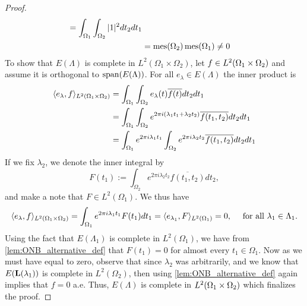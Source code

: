 \documentclass[../thesis.tex]{subfiles}
\begin{document}
\begin{proof}
\begin{align*}
        = \int_{\Omega_1} \int_{\Omega_2} |1|^2 dt_2 dt_1\\
        &= \operatorname{mes}(\Omega_2)\operatorname{mes}(\Omega_1) \neq 0
    \end{align*}
    To show that $E(\Lambda)$ is complete in $L^2(\Omega_1 \times \Omega_2)$, let $f\in L^2(\Omega_1 \times \Omega_2)$ and assume it is orthogonal to $\operatorname{span}(E(\Lambda))$. For all $e_\lambda \in E(\Lambda)$ the inner product is
    \begin{align*} %
        \braa{e_\lambda,f}_{L^2\brac{\Omega_1 \times \Omega_2}}
        &= \int_{\Omega_1} \int_{\Omega_2} e_\lambda(t) \overline{f(t)} dt_2dt_1 \\
        &= \int_{\Omega_1} \int_{\Omega_2} e^{2\pi i  (\lambda_1 t_1 + \lambda_2 t_2)} \overline{f(t_1,t_2)} dt_2 dt_1 \\
        &= \int_{\Omega_1} e^{2 \pi i \lambda_1 t_1} \int_{\Omega_2}e^{2 \pi i \lambda_2 t_2} \overline{f(t_1,t_2)} dt_2 dt_1
    \end{align*}
    If we fix $\lambda_2$, we denote the inner integral by 
    \begin{equation}\label{eq:inner_eq}
        F(t_1) := \int_{\Omega_2} e^{2 \pi i \lambda_2 t_2} \overline{f(t_1,t_2)} dt_2,
    \end{equation}
    and make a note that $F\in L^2(\Omega_1)$. We thus have %
    \begin{equation*}%
        \braa{e_{\lambda}, f}_{L^2(\Omega_1\times \Omega_2)} = \int_{\Omega_1} e^{2 \pi i \lambda_1 t_1} F(t_1) dt_1 = \braa{e_{\lambda_1}, F}_{L^2(\Omega_1)} = 0, \quad \text{ for all } \lambda_1 \in \Lambda_1 .
    \end{equation*}
    Using the fact that $E(\Lambda_1)$ is complete in $L^2(\Omega_1)$, we have from \cref{lem:ONB_alternative_def} that $F(t_1)=0$ for almost every $t_1 \in \Omega_1$. Now as we must have  equal to zero, observe that since $\lambda_2$ was arbitrarily, and we know that $E(\mathbf{L}(\lambda_1))$ is complete in $L^2(\Omega_2)$, then using \cref{lem:ONB_alternative_def} again implies that $f=0$ a.e. Thus, $E(\Lambda)$ is complete in $L^2(\Omega_1 \times \Omega_2)$ which finalizes the proof.
\end{proof}
\end{document}
